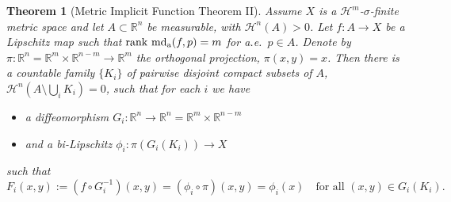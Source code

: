 \documentclass[12pt,leqno]{amsart}
\newtheorem{theorem}{Theorem}
\theoremstyle{definition}
\newtheorem{remark}[theorem]{Remark}
\newcommand{\bbbr}{\mathbb R}
\def\H{{\mathcal H}}
\def\rank{{\rm rank\,}}
\def\apmd{\operatorname{md_{\rm a}}}
\numberwithin{theorem}{section} \numberwithin{equation}{section}
\begin{document}
\begin{theorem}[Metric Implicit Function Theorem II]
\label{6:thm2}
Assume $X$ is a $\H^m$-$\sigma$-finite metric space and let  $A\subset \bbbr^n$ be measurable, with $\H^n(A)>0$. Let $f\colon A\to X$ be a Lipschitz map such that $\rank \apmd (f,p)=m$ for a.e.\ $p\in A$. Denote by $\pi:\bbbr^n=\bbbr^{m}\times\bbbr^{n-m}\to\bbbr^m$ the orthogonal projection, $\pi(x,y)=x$.
Then there is a countable family $\{K_i\}$ of pairwise disjoint compact subsets of $A$,  $\H^n(A\setminus \bigcup_i K_i)=0$, such that for each $i$ we have
\begin{itemize}
\item a diffeomorphism $G_i:\bbbr^n\to\bbbr^n=\bbbr^m\times\bbbr^{n-m}$
\item and a bi-Lipschitz $\phi_i:\pi(G_i(K_i))\to X$
\end{itemize}
such that
$$
F_i(x,y):=(f\circ G_i^{-1})(x,y)=
(\phi_i\circ\pi)(x,y)=
\phi_i(x)
\quad
\text{for all }(x,y)\in G_i(K_i).
$$
\end{theorem}
\end{document}
